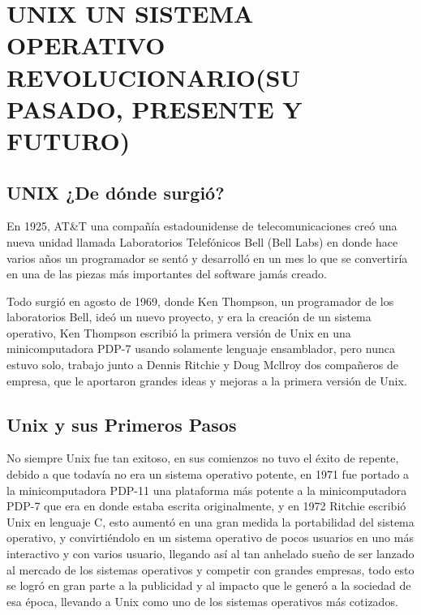 \chapter*{UNIX UN SISTEMA OPERATIVO REVOLUCIONARIO(SU PASADO, PRESENTE Y FUTURO)}

\section*{UNIX ¿De dónde surgió?}
En 1925, AT\&T  una compañía estadounidense de telecomunicaciones  creó una nueva unidad llamada Laboratorios Telefónicos Bell (Bell Labs) en donde hace  varios años  un             programador se sentó y  desarrolló   en un mes lo que se  convertiría  en una de las piezas más importantes del software jamás creado.

Todo surgió en agosto de 1969, donde Ken Thompson, un programador  de los laboratorios Bell, ideó  un nuevo proyecto, y era la creación de un sistema  operativo, Ken 
Thompson escribió la primera versión de Unix en una minicomputadora PDP-7 usando solamente lenguaje ensamblador, pero nunca  estuvo solo, trabajo junto a  Dennis Ritchie y 
Doug Mcllroy dos compañeros de empresa, que le aportaron  grandes ideas y mejoras  a la primera versión  de Unix.


\section*{Unix y sus Primeros Pasos}
No siempre Unix fue tan exitoso, en sus comienzos no tuvo el éxito de repente, debido a que todavía no era un sistema operativo potente, en 1971 fue portado a la 
minicomputadora PDP-11 una plataforma más potente a la minicomputadora PDP-7 que era en donde estaba escrita originalmente, y en 1972 Ritchie escribió Unix en lenguaje C, 
esto aumentó en una gran medida la portabilidad del sistema operativo, y convirtiéndolo en un sistema operativo de pocos usuarios en uno más interactivo y con varios 
usuario, llegando así al tan anhelado sueño de ser lanzado al mercado de los sistemas operativos y competir con grandes empresas, todo esto se logró en gran parte a la  
publicidad y al impacto que le generó a la sociedad de esa época, llevando a Unix como uno de los sistemas operativos más cotizados.


